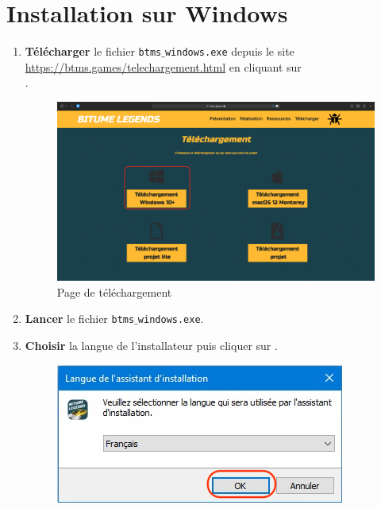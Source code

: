 \documentclass[a4paper,12pt]{article}
\begin{document}
    \section{Installation sur Windows}
        \begin{enumerate}
            \item
                \textbf{Télécharger} le fichier \texttt{btms$\_$windows.exe}
                depuis le site \\\url{https://btms.games/telechargement.html} en
                cliquant sur \\.\\
                \begin{figure}[h]
                    \includegraphics[scale=0.22]{dl_page_win.png}
                    \caption{Page de téléchargement}
                \end{figure}
            \item
                \textbf{Lancer} le fichier \texttt{btms$\_$windows.exe}.
            \clearpage
            \item 
                \textbf{Choisir} la langue de l'installateur puis cliquer sur
                .
                \begin{figure}[h]
                    \centering
                    \includegraphics[scale=0.7]{langues.png}

\end{figure}
\end{enumerate}
\end{document}
